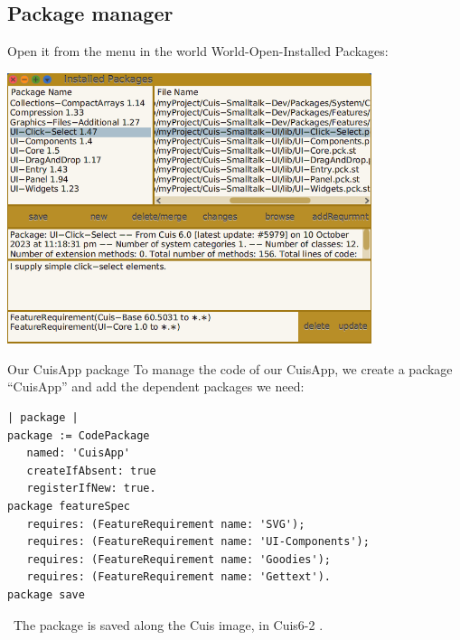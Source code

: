 \documentclass{beamer}
\newcommand{\tip}{\boldmath{\textcolor{red}{$\Rightarrow$}}}
\begin{document}
\subsection{Package manager}
\begin{frame}
  Open it from the menu in the world World-Open-Installed Packages:
  \begin{center}
    \includegraphics[width=0.8\textwidth]{PackageManager.png}    
  \end{center}
\end{frame}
%
\begin{frame}[fragile]{Our CuisApp package}
  To manage the code of our CuisApp, we create a package ``CuisApp''
  and add the dependent packages we need:
\fontsize{10pt}{8pt}\selectfont

\begin{lstlisting}[language=Smalltalk]
| package |
package := CodePackage
   named: 'CuisApp'
   createIfAbsent: true
   registerIfNew: true.
package featureSpec 
   requires: (FeatureRequirement name: 'SVG');
   requires: (FeatureRequirement name: 'UI-Components');
   requires: (FeatureRequirement name: 'Goodies');
   requires: (FeatureRequirement name: 'Gettext').
package save
  \end{lstlisting}

  \tip\ The package is saved along the Cuis image, in
  Cuis6-2 .
\end{frame}
\end{document}
